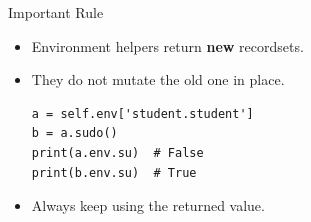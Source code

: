 \begin{frame}[fragile]{Important Rule}
	\begin{itemize}
		\item Environment helpers return \textbf{new} recordsets.
		\item They do not mutate the old one in place.
\begin{lstlisting}
a = self.env['student.student']
b = a.sudo()
print(a.env.su)  # False
print(b.env.su)  # True
\end{lstlisting}
		\item Always keep using the returned value.
	\end{itemize}
\end{frame}
